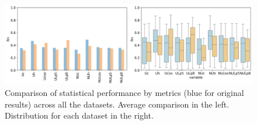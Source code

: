 \documentclass[twocolumn]{article}
\begin{document}
\begin{figure}[h]
  \centering
  \includegraphics[width=\textwidth]{img/compare_metrics_distribution.jpg}
  \caption{Comparison of statistical performance by metrics (blue for original results) across all the datasets. 
  Average comparison in the left. Distribution for each dataset in the right.}
  \label{fig:ari-statistics}
\end{figure}
\end{document}
